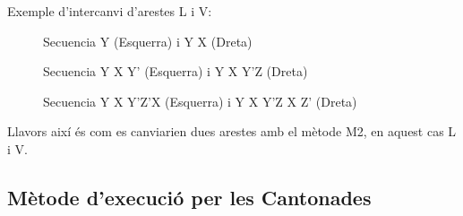 Exemple d'intercanvi d'arestes L i V:

\begin{figure}[htbp]
    \centering
    \begin{subfigure}
        \centering\RubikCubeSolvedWY
    \end{subfigure}
    \begin{subfigure}
        \centering\RubikCubeSolvedWY
    \end{subfigure}
    \caption{Secuencia Y (Esquerra) i Y X (Dreta)}
\end{figure}

\begin{figure}[htbp]
    \centering
    \begin{subfigure}
        \centering\RubikCubeSolvedWY
    \end{subfigure}
    \begin{subfigure}
        \centering\RubikCubeSolvedWY
    \end{subfigure}
    \caption{Secuencia Y X Y' (Esquerra) i Y X Y'Z (Dreta)}
\end{figure}

\begin{figure}[h!]
    \centering
    \begin{subfigure}
        \centering\RubikCubeSolvedWY
    \end{subfigure}
    \begin{subfigure}
        \centering\RubikCubeSolvedWY
    \end{subfigure}
    \caption{Secuencia Y X Y'Z'X (Esquerra) i Y X Y'Z X Z' (Dreta)}
\end{figure}

Llavors així és com es canviarien dues arestes amb el mètode M2, en aquest cas L i V.

\subsection{Mètode d'execució per les Cantonades}

